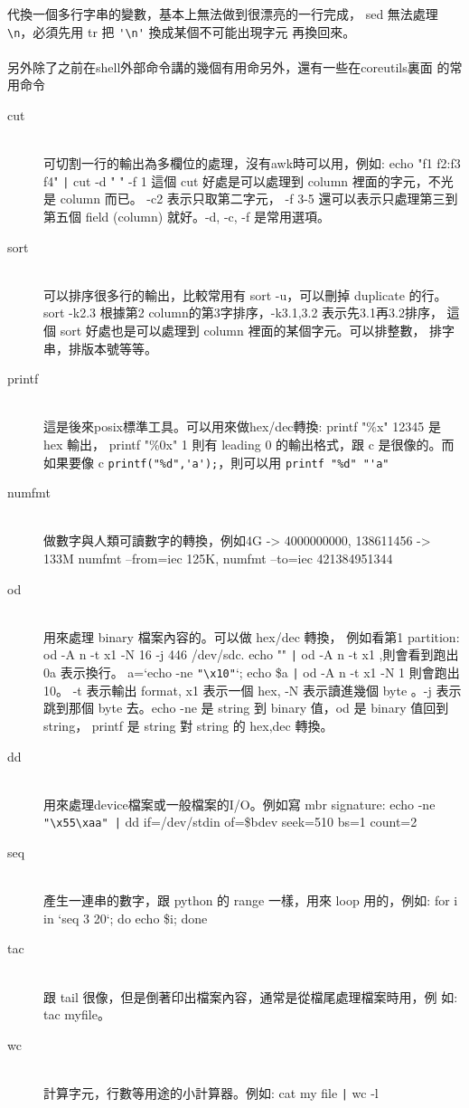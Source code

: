     代換一個多行字串的變數，基本上無法做到很漂亮的一行完成，
    sed 無法處理 \verb=\n=，必須先用 tr 把 \verb='\n'= 換成某個不可能出現字元
    再換回來。
    \\\\
    另外除了之前在shell外部命令講的幾個有用命另外，還有一些在coreutils裏面
    的常用命令
    \begin{description}
      \item [cut] \hfill \\
        可切割一行的輸出為多欄位的處理，沒有awk時可以用，例如:
        echo "f1 f2:f3 f4" \verb=|= cut -d " " -f 1
        這個 cut 好處是可以處理到 column 裡面的字元，不光是 column 而已。
        -c2 表示只取第二字元， -f 3-5 還可以表示只處理第三到第五個 field
        (column) 就好。-d, -c, -f 是常用選項。
      \item [sort] \hfill \\
        可以排序很多行的輸出，比較常用有 sort -u，可以刪掉 duplicate 的行。
        sort -k2.3 根據第2 column的第3字排序，-k3.1,3.2 表示先3.1再3.2排序，
        這個 sort 好處也是可以處理到 column 裡面的某個字元。可以排整數，
        排字串，排版本號等等。
      \item [printf] \hfill \\
        這是後來posix標準工具。可以用來做hex/dec轉換:
        printf "\%x" 12345 是 hex 輸出， printf "\%0x" 1 則有
        leading 0 的輸出格式，跟 c 是很像的。而如果要像 c 
        \verb=printf("%d",'a');=，則可以用 \verb=printf "%d" "'a"=
      \item [numfmt] \hfill \\
        做數字與人類可讀數字的轉換，例如4G -> 4000000000, 138611456 -> 133M
        numfmt --from=iec 125K, numfmt --to=iec 421384951344
      \item [od] \hfill \\
        用來處理 binary 檔案內容的。可以做 hex/dec 轉換，
        例如看第1 partition:  od -A n -t x1 -N 16 -j 446 /dev/sdc.
        echo "" \verb=|= od -A n -t x1 ,則會看到跑出 0a 表示換行。
        a=`echo -ne \verb="\x10"=`; echo \$a \verb=|= od -A n -t x1 -N 1 
        則會跑出 10。 -t 表示輸出 format, x1 表示一個 hex, -N 表示讀進幾個 byte
        。-j 表示跳到那個 byte 去。echo -ne 是 string 到 binary 值，od 是 
        binary 值回到 string， printf 是 string 對 string 的 hex,dec 轉換。
      \item [dd] \hfill \\
        用來處理device檔案或一般檔案的I/O。例如寫 mbr signature:
        echo -ne \verb="\x55\xaa" |= dd if=/dev/stdin of=\$bdev seek=510 bs=1
        count=2
      \item [seq] \hfill \\
        產生一連串的數字，跟 python 的 range 一樣，用來 loop 用的，例如:
        for i in `seq 3 20`; do echo \$i; done
      \item [tac] \hfill \\
        跟 tail 很像，但是倒著印出檔案內容，通常是從檔尾處理檔案時用，例
        如: tac myfile。
      \item [wc] \hfill \\
        計算字元，行數等用途的小計算器。例如: cat my file \verb=|= wc -l
    \end{description}
